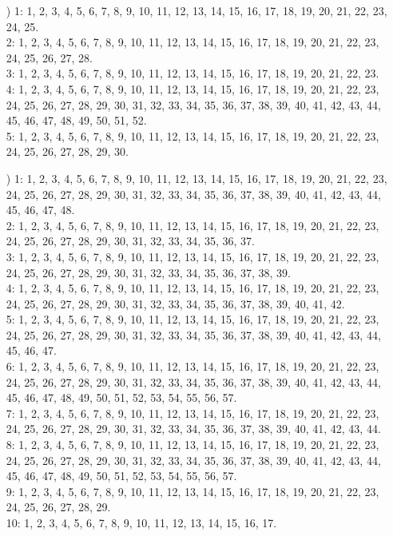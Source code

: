 \documentclass[a4paper,11pt]{article}
\numberwithin{equation}{section}
\begin{document}
\begin{itemize}
\item[\romannumeral2)] 1: 1, 2, 3, 4, 5, 6, 7, 8, 9, 10, 11, 12, 13, 14,
  15, 16, 17, 18, 19, 20, 21, 22, 23, 24, 25. \\
  2: 1, 2, 3, 4, 5, 6, 7, 8, 9, 10, 11, 12, 13, 14, 15, 16, 17, 18, 19,
  20, 21, 22, 23, 24, 25, 26, 27, 28. \\
  3: 1, 2, 3, 4, 5, 6, 7, 8, 9, 10, 11, 12, 13, 14, 15, 16, 17, 18, 19, 20,
  21, 22, 23. \\
  4: 1, 2, 3, 4, 5, 6, 7, 8, 9, 10, 11, 12, 13, 14, 15, 16, 17, 18, 19, 20,
  21, 22, 23, 24, 25, 26, 27, 28, 29, 30, 31, 32, 33, 34, 35, 36, 37, 38,
  39, 40, 41, 42, 43, 44, 45, 46, 47, 48, 49, 50, 51, 52. \\
  5: 1, 2, 3, 4, 5, 6, 7, 8, 9, 10, 11, 12, 13, 14, 15, 16, 17, 18, 19, 20,
  21, 22, 23, 24, 25, 26, 27, 28, 29, 30.



\item[\romannumeral3)] 1: 1, 2, 3, 4, 5, 6, 7, 8, 9, 10, 11, 12, 13, 14, 15,
  16, 17, 18, 19, 20, 21, 22, 23, 24, 25, 26, 27, 28, 29, 30, 31, 32, 33,
  34, 35, 36, 37, 38, 39, 40, 41, 42, 43, 44, 45, 46, 47, 48. \\
  2:  1, 2, 3, 4, 5, 6, 7, 8, 9, 10, 11, 12, 13, 14, 15, 16, 17, 18, 19,
  20, 21, 22, 23, 24, 25, 26, 27, 28, 29, 30, 31, 32, 33, 34, 35, 36, 37. \\
  3: 1, 2, 3, 4, 5, 6, 7, 8, 9, 10, 11, 12, 13, 14, 15, 16, 17, 18, 19, 20,
  21, 22, 23, 24, 25, 26, 27, 28, 29, 30, 31, 32, 33, 34, 35, 36, 37, 38,
  39. \\
  4: 1, 2, 3, 4, 5, 6, 7, 8, 9, 10, 11, 12, 13, 14, 15, 16, 17, 18, 19, 20,
  21, 22, 23, 24, 25, 26, 27, 28, 29, 30, 31, 32, 33, 34, 35, 36, 37, 38,
  39, 40, 41, 42. \\
  5: 1, 2, 3, 4, 5, 6, 7, 8, 9, 10, 11, 12, 13, 14, 15, 16, 17, 18, 19, 20,
  21, 22, 23, 24, 25, 26, 27, 28, 29, 30, 31, 32, 33, 34, 35, 36, 37, 38,
  39, 40, 41, 42, 43, 44, 45, 46, 47. \\
  6: 1, 2, 3, 4, 5, 6, 7, 8, 9, 10, 11, 12, 13, 14, 15, 16, 17, 18, 19, 20,
  21, 22, 23, 24, 25, 26, 27, 28, 29, 30, 31, 32, 33, 34, 35, 36, 37, 38,
  39, 40, 41, 42, 43, 44, 45, 46, 47, 48, 49, 50, 51, 52, 53, 54, 55, 56,
  57. \\
  7: 1, 2, 3, 4, 5, 6, 7, 8, 9, 10, 11, 12, 13, 14, 15, 16, 17, 18, 19, 20,
  21, 22, 23, 24, 25, 26, 27, 28, 29, 30, 31, 32, 33, 34, 35, 36, 37, 38,
  39, 40, 41, 42, 43, 44. \\
  8: 1, 2, 3, 4, 5, 6, 7, 8, 9, 10, 11, 12, 13, 14, 15, 16, 17, 18, 19, 20,
  21, 22, 23, 24, 25, 26, 27, 28, 29, 30, 31, 32, 33, 34, 35, 36, 37, 38,
  39, 40, 41, 42, 43, 44, 45, 46, 47, 48, 49, 50, 51, 52, 53, 54, 55, 56,
  57. \\
  9: 1, 2, 3, 4, 5, 6, 7, 8, 9, 10, 11, 12, 13, 14, 15, 16, 17, 18, 19, 20,
  21, 22, 23, 24, 25, 26, 27, 28, 29. \\
  10: 1, 2, 3, 4, 5, 6, 7, 8, 9, 10, 11, 12, 13, 14, 15, 16, 17.




\end{itemize}
\end{document}
